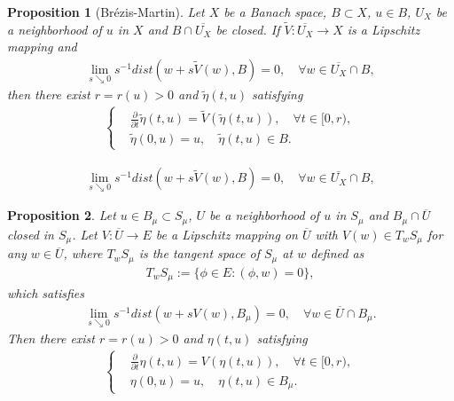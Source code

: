 \documentclass[10pt,a4paper]{amsart}
\newtheorem{proposition}{Proposition}
\begin{document}
\begin{proposition}[Br\'ezis-Martin] \label{propbm}
	Let $X$ be a Banach space, $B \subset X$, $u \in B$, $U_X$ be a neighborhood of $u$ in $X$ and $B \cap \overline{U_X}$ be closed. If $\widetilde V: \overline{U_X} \to X$ is a Lipschitz mapping and
	\begin{align} \label{eqd=0banachcase}
		\lim_{s \searrow 0}s^{-1}dist(w + s\widetilde V(w),B) = 0, \quad \forall w \in \overline{U_X} \cap B,
	\end{align}
	then there exist $r = r(u) > 0$ and $\tilde\eta(t,u)$ satisfying
	\begin{align*}
		\left\{
		\begin{aligned}
			& \frac{\partial}{\partial t}\tilde\eta(t,u) = \widetilde V(\tilde\eta(t,u)), \quad \forall t \in [0,r), \\
			& \tilde\eta(0,u) = u, \quad \tilde\eta(t,u) \in B.
		\end{aligned}
		\right.
	\end{align*}
\end{proposition}

	\begin{align} 
		\lim_{s \searrow 0}s^{-1}dist(w + s\widetilde V(w),B) = 0, \quad \forall w \in \overline{U_X} \cap B,
	\end{align}

\begin{proposition} \label{propbmmanifold}
	Let $u \in B_\mu \subset S_\mu$, $U$ be a neighborhood of $u$ in $S_\mu$ and $B_\mu \cap \overline{U}$ closed in $S_\mu$. Let $V: \overline{U} \to E$ be a Lipschitz mapping on $\overline{U}$ with $V(w) \in T_wS_\mu$ for any $w \in \overline{U}$, where $T_wS_\mu$ is the tangent space of $S_\mu$ at $w$ defined as
	\begin{align*}
		T_wS_\mu := \bigl\{\phi \in E: (\phi,w) = 0\bigr\},
	\end{align*}
    which satisfies
    \begin{align} \label{eqd=0}
    	\lim_{s \searrow 0}s^{-1}dist(w + sV(w),B_\mu) = 0, \quad \forall w \in \overline{U} \cap B_\mu.
    \end{align}
    Then  there exist $r = r(u) > 0$ and $\eta(t,u)$ satisfying 
	\begin{align*} 
		\left\{
			\begin{aligned}
				& \frac{\partial}{\partial t}\eta(t,u) = V(\eta(t,u)), \quad \forall t \in [0,r), \\
				& \eta(0,u) = u, \quad \eta(t,u) \in B_\mu.
			\end{aligned}
		\right.
	\end{align*}
\end{proposition}
\end{document}
